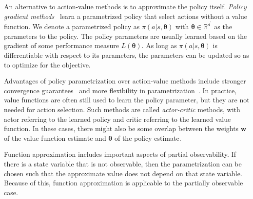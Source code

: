 An alternative to action-value methods is to approximate the policy itself.
\textit{Policy gradient methods}~\cite{sutton_policygrad_1999} learn a parametrized policy that select actions without a value function.
We denote a parametrized policy as \(\pi(a|s,\boldsymbol{\theta})\) with \(\boldsymbol{\theta} \in \mathbb{R}^{d^\prime}\) as the parameters to the policy.
The policy parameters are usually learned based on the gradient of some performance measure \(L(\boldsymbol{\theta})\).
As long as \(\pi(a|s,\boldsymbol{\theta})\) is differentiable with respect to its parameters, the parameters can be updated so as to optimize for the objective.

Advantages of policy parametrization over action-value methods include stronger convergence guarantees~\cite{sutton_policygrad_1999} and more flexibility in parametrization~\cite{sutton_reinforcement_2018}.
In practice, value functions are often still used to learn the policy parameter, but they are not needed for action selection.
Such methods are called \textit{actor-critic} methods, with actor referring to the learned policy and critic referring to the learned value function.
In these cases, there might also be some overlap between the weights \(\mathbf{w}\) of the value function estimate and \(\boldsymbol{\theta}\) of the policy estimate. 

Function approximation includes important aspects of partial observability.
If there is a state variable that is not observable,
then the parametrization can be chosen such that the approximate value does not depend on that state variable.
Because of this, function approximation is applicable to the partially observable case.~\cite{sutton_reinforcement_2018}



